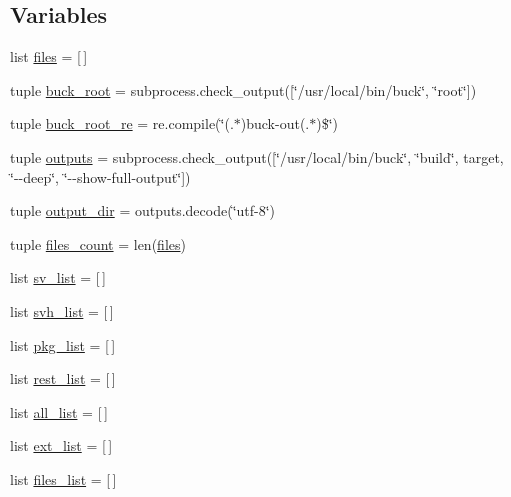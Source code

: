 \subsection*{Variables}
\begin{DoxyCompactItemize}
\item 
list \hyperlink{namespacefb__utils_ada75fccb2ac0a4b4a48c90bdf0821fd2}{files} = \mbox{[}$\,$\mbox{]}
\item 
tuple \hyperlink{namespacefb__utils_ae7dbeeac0d9d06d0c8412bc84bd91eed}{buck\-\_\-root} = subprocess.\-check\-\_\-output(\mbox{[}\char`\"{}/usr/local/bin/buck\char`\"{}, \char`\"{}root\char`\"{}\mbox{]})
\item 
tuple \hyperlink{namespacefb__utils_aa82478ef5cba8a32c2c7b1354312ae94}{buck\-\_\-root\-\_\-re} = re.\-compile(\char`\"{}(.$\ast$)buck-\/out(.$\ast$)\$\char`\"{})
\item 
tuple \hyperlink{namespacefb__utils_a0462d4018caf2858ea278a67705d8073}{outputs} = subprocess.\-check\-\_\-output(\mbox{[}\char`\"{}/usr/local/bin/buck\char`\"{}, \char`\"{}build\char`\"{}, target, \char`\"{}-\/-\/deep\char`\"{}, \char`\"{}-\/-\/show-\/full-\/output\char`\"{}\mbox{]})
\item 
tuple \hyperlink{namespacefb__utils_a2c908403428ebd5029f8d92d48d5d514}{output\-\_\-dir} = outputs.\-decode(\char`\"{}utf-\/8\char`\"{})
\item 
tuple \hyperlink{namespacefb__utils_a711f7adf2968e603be09e31a7a2dc090}{files\-\_\-count} = len(\hyperlink{namespacefb__utils_ada75fccb2ac0a4b4a48c90bdf0821fd2}{files})
\item 
list \hyperlink{namespacefb__utils_ac57a5d2600819a0cd95a751784e809c9}{sv\-\_\-list} = \mbox{[}$\,$\mbox{]}
\item 
list \hyperlink{namespacefb__utils_a1ee53c4fb1a76769ec7757ab432117e0}{svh\-\_\-list} = \mbox{[}$\,$\mbox{]}
\item 
list \hyperlink{namespacefb__utils_a6887692f592843384a67fefe3b9144da}{pkg\-\_\-list} = \mbox{[}$\,$\mbox{]}
\item 
list \hyperlink{namespacefb__utils_a905045d2b7aefe95f688c8257c04e455}{rest\-\_\-list} = \mbox{[}$\,$\mbox{]}
\item 
list \hyperlink{namespacefb__utils_aca12fc82e453152f81a1819957a5bdbd}{all\-\_\-list} = \mbox{[}$\,$\mbox{]}
\item 
list \hyperlink{namespacefb__utils_a3bb6a33cce451d2aa6cd555cbf3f81c9}{ext\-\_\-list} = \mbox{[}$\,$\mbox{]}
\item 
list \hyperlink{namespacefb__utils_abfa8ee516782c6f0fc32b4407b807f65}{files\-\_\-list} = \mbox{[}$\,$\mbox{]}

\end{DoxyCompactItemize}
